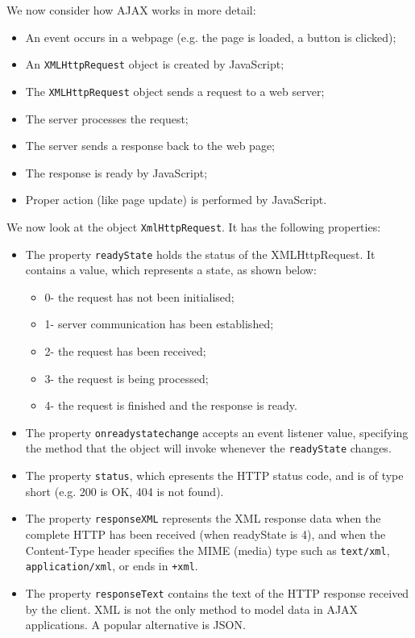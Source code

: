 \documentclass[a4paper, openany]{memoir}
\begin{document}
We now consider how AJAX works in more detail:
\begin{itemize}
    \item An event occurs in a webpage (e.g. the page is loaded, a button is clicked);
    \item An \texttt{XMLHttpRequest} object is created by JavaScript;
    \item The \texttt{XMLHttpRequest} object sends a request to a web server;
    \item The server processes the request;
    \item The server sends a response back to the web page;
    \item The response is ready by JavaScript;
    \item Proper action (like page update) is performed by JavaScript.
\end{itemize}
We now look at the object \texttt{XmlHttpRequest}. It has the following properties:
\begin{itemize}
    \item The property \texttt{readyState} holds the status of the XMLHttpRequest. It contains a value, which represents a state, as shown below:
    \begin{itemize}
        \item 0- the request has not been initialised;
        \item 1- server communication has been established;
        \item 2- the request has been received;
        \item 3- the request is being processed;
        \item 4- the request is finished and the response is ready.
    \end{itemize}
    \item The property \texttt{onreadystatechange} accepts an event listener value, specifying the method that the object will invoke whenever the \texttt{readyState} changes.
    \item The property \texttt{status}, which epresents the HTTP status code, and is of type short (e.g. 200 is OK, 404 is not found).
    \item The property \texttt{responseXML} represents the XML response data when the complete HTTP has been received (when readyState is 4), and when the Content-Type header specifies the MIME (media) type such as \texttt{text/xml},  \texttt{application/xml}, or ends in \texttt{+xml}.
    \item The property \texttt{responseText} contains the text of the HTTP response received by the client. XML is not the only method to model data in AJAX applications. A popular alternative is JSON.
\end{itemize}
\end{document}
